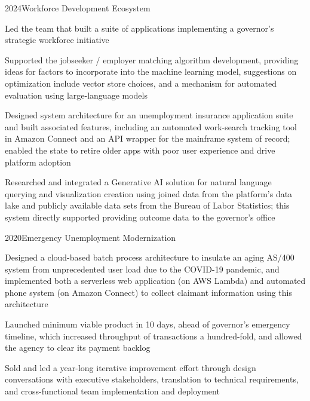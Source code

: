 \project
  {2024}{Workforce Development Ecosystem}
  {\begin{achievements}
    \item Led the team that built a suite of applications implementing a governor's strategic workforce initiative
    \item Supported the jobseeker / employer matching algorithm development, providing ideas for factors to incorporate into the machine learning model, suggestions on optimization include vector store choices, and a mechanism for automated evaluation using large-language models
    \item Designed system architecture for an unemployment insurance application suite and built associated features, including an automated work-search tracking tool in Amazon Connect and an API wrapper for the mainframe system of record; enabled the state to retire older apps with poor user experience and drive platform adoption
    \item Researched and integrated a Generative AI solution for natural language querying and visualization creation using joined data from the platform's data lake and publicly available data sets from the Bureau of Labor Statistics; this system directly supported providing outcome data to the governor's office
  \end{achievements}}

\project
  {2020}{Emergency Unemployment Modernization}
  {\begin{achievements}
    \item Designed a cloud-based batch process architecture to insulate an aging AS/400 system from unprecedented user load due to the COVID-19 pandemic, and implemented both a serverless web application (on AWS Lambda) and automated phone system (on Amazon Connect) to collect claimant information using this architecture
    \item Launched minimum viable product in 10 days, ahead of governor's emergency timeline, which increased throughput of transactions a hundred-fold, and allowed the agency to clear its payment backlog
    \item Sold and led a year-long iterative improvement effort through design conversations with executive stakeholders, translation to technical requirements, and cross-functional team implementation and deployment
  \end{achievements}}

